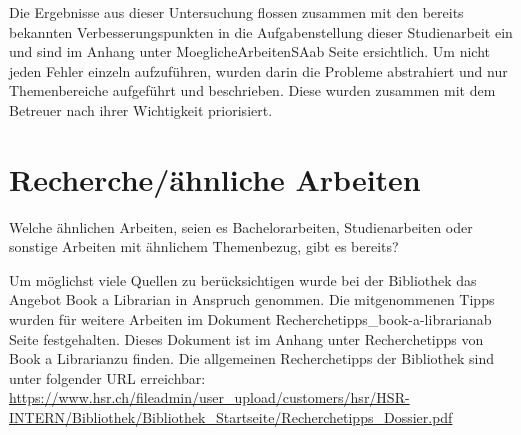 \bigskip

Die Ergebnisse aus dieser Untersuchung flossen zusammen mit den bereits bekannten Verbesserungspunkten in die Aufgabenstellung dieser Studienarbeit ein und sind im Anhang unter \glqq MoeglicheArbeitenSA\grqq ab Seite \hyperlink{page.\getpagerefnumber{pdf:moeglicheArbeiten}}{} ersichtlich. Um nicht jeden Fehler einzeln aufzuführen, wurden darin die Probleme abstrahiert und nur Themenbereiche aufgeführt und beschrieben. Diese wurden zusammen mit dem Betreuer nach ihrer Wichtigkeit priorisiert.

\newpage

\section{Recherche/ähnliche Arbeiten}
\label{sec:rechercheAehnlicheArbeiten}

Welche ähnlichen Arbeiten, seien es Bachelorarbeiten, Studienarbeiten oder sonstige Arbeiten mit ähnlichem Themenbezug, gibt es bereits?

\bigskip

Um möglichst viele Quellen zu berücksichtigen wurde bei der Bibliothek das Angebot \glqq Book a Librarian\grqq \cite{hsr_book_a_librarian} in Anspruch genommen. Die mitgenommenen Tipps wurden für weitere Arbeiten im Dokument \glqq Recherchetipps\_book-a-librarian\grqq ab Seite \hyperlink{page.\getpagerefnumber{pdf:recherchetipps}}{} festgehalten. Dieses Dokument ist im Anhang unter \glqq Recherchetipps von Book a Librarian\grqq zu finden. Die allgemeinen Recherchetipps der Bibliothek sind unter folgender URL erreichbar: \url{https://www.hsr.ch/fileadmin/user_upload/customers/hsr/HSR-INTERN/Bibliothek/Bibliothek_Startseite/Recherchetipps_Dossier.pdf}

\bigskip

